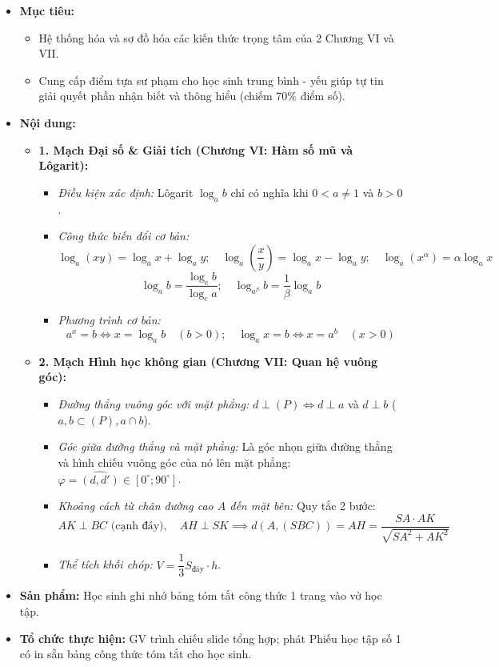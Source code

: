 \documentclass[12pt, a4paper]{article}
\begin{document}
\begin{itemize}[leftmargin=1.2cm]
    \item[a)] \textbf{Mục tiêu:}
    \begin{itemize}[leftmargin=0.6cm]
        \item Hệ thống hóa và sơ đồ hóa các kiến thức trọng tâm của 2 Chương VI và VII.
        \item Cung cấp điểm tựa sư phạm cho học sinh trung bình - yếu giúp tự tin giải quyết phần nhận biết và thông hiểu (chiếm 70\% điểm số).
    \end{itemize}

    \item[b)] \textbf{Nội dung:}
    \begin{itemize}[leftmargin=0.6cm]
        \item \textbf{1. Mạch Đại số \& Giải tích (Chương VI: Hàm số mũ và Lôgarit):}
        \begin{itemize}
            \item \textit{Điều kiện xác định:} Lôgarit $\log_a b$ chỉ có nghĩa khi $0 < a \ne 1$ và $b > 0$.
            \item \textit{Công thức biến đổi cơ bản:}
            $$\log_a (x y) = \log_a x + \log_a y; \quad \log_a \left(\dfrac{x}{y}\right) = \log_a x - \log_a y; \quad \log_a (x^\alpha) = \alpha \log_a x$$
            $$\log_a b = \dfrac{\log_c b}{\log_c a}; \quad \log_{a^\beta} b = \dfrac{1}{\beta} \log_a b$$
            \item \textit{Phương trình cơ bản:}
            $$a^x = b \iff x = \log_a b \quad (b > 0); \quad \log_a x = b \iff x = a^b \quad (x > 0)$$
        \end{itemize}

        \item \textbf{2. Mạch Hình học không gian (Chương VII: Quan hệ vuông góc):}
        \begin{itemize}
            \item \textit{Đường thẳng vuông góc với mặt phẳng:} $d \perp (P) \iff d \perp a$ và $d \perp b$ ($a, b \subset (P), a \cap b$).
            \item \textit{Góc giữa đường thẳng và mặt phẳng:} Là góc nhọn giữa đường thẳng và hình chiếu vuông góc của nó lên mặt phẳng: $\varphi = \widehat{(d, d')} \in [0^\circ; 90^\circ]$.
            \item \textit{Khoảng cách từ chân đường cao $A$ đến mặt bên:} Quy tắc 2 bước:
            $$AK \perp BC \text{ (cạnh đáy)}, \quad AH \perp SK \implies d(A, (SBC)) = AH = \dfrac{SA \cdot AK}{\sqrt{SA^2 + AK^2}}$$
            \item \textit{Thể tích khối chóp:} $V = \dfrac{1}{3} S_{\text{đáy}} \cdot h$.
        \end{itemize}
    \end{itemize}

    \item[c)] \textbf{Sản phẩm:} Học sinh ghi nhớ bảng tóm tắt công thức 1 trang vào vở học tập.
    \item[d)] \textbf{Tổ chức thực hiện:} GV trình chiếu slide tổng hợp; phát Phiếu học tập số 1 có in sẵn bảng công thức tóm tắt cho học sinh.
\end{itemize}
\end{document}
